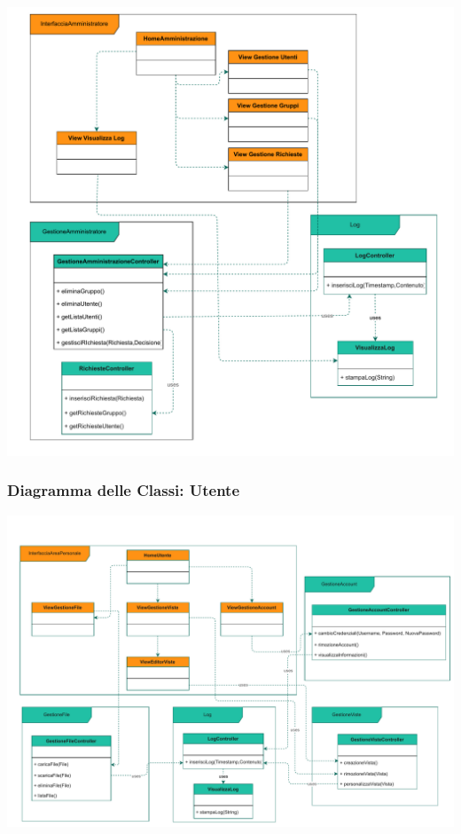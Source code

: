 \begin{adjustwidth}{-2.5cm}{0cm}
\includegraphics[scale=0.8]{classi/Package-Classi-Amministrazione.drawio.pdf}
\end{adjustwidth}
\vspace{0.5cm}




\subsubsection*{Diagramma delle Classi: Utente}
\vspace{0.5cm}


\vspace{0.5cm}
\begin{adjustwidth}{-3.5cm}{0cm}
\includegraphics[scale=0.7]{classi/Package-Classi-Utente.drawio.pdf}
\end{adjustwidth}




